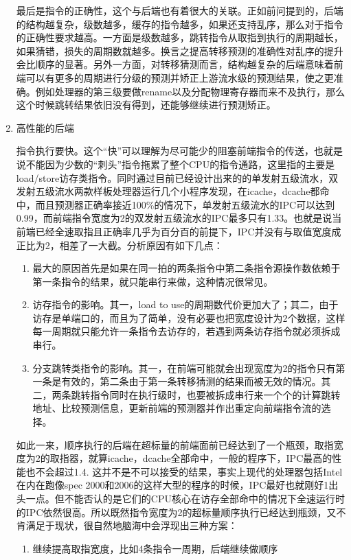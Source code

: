 \documentclass[11pt]{article}
\begin{document}
\begin{enumerate}
	最后是指令的正确性，这个与后端也有着很大的关联。正如前问提到的，后端的结构越复杂，级数越多，缓存的指令越多，如果还支持乱序，那么对于指令的正确性要求越高。一方面是级数越多，跳转指令从取指到执行的周期越长，如果猜错，损失的周期数就越多。换言之提高转移预测的准确性对乱序的提升会比顺序的显著。另外一方面，对转移猜测而言，结构越复杂的后端意味着前端可以有更多的周期进行分级的预测并矫正上游流水级的预测结果，使之更准确。例如处理器的第三级要做rename以及分配物理寄存器而来不及执行，那么这个时候跳转结果依旧没有得到，还能够继续进行预测矫正。
	\item 高性能的后端
	
	指令执行要快。这个``快''可以理解为尽可能少的阻塞前端指令的传送，也就是说不能因为少数的``刺头''指令拖累了整个CPU的指令通路，这里指的主要是load/store访存类指令。同时通过目前已经设计出来的的单发射五级流水，双发射五级流水两款样板处理器运行几个小程序发现，在icache，dcache都命中，而且预测器正确率接近100\%的情况下，单发射五级流水的IPC可以达到0.99，而前端指令宽度为2的双发射五级流水的IPC最多只有1.33。也就是说当前端已经全速取指且正确率几乎为百分百的前提下，IPC并没有与取值宽度成正比为2，相差了一大截。分析原因有如下几点：
	\begin{enumerate}
		\item 最大的原因首先是如果在同一拍的两条指令中第二条指令源操作数依赖于第一条指令的结果，就只能串行来做，这种情况很常见。
		\item 访存指令的影响。其一，load to use的周期数代价更加大了；其二，由于访存是单端口的，而且为了简单，没有必要也把宽度设计为2个数据，这样每一周期就只能允许一条指令去访存的，若遇到两条访存指令就必须拆成串行。
		\item 分支跳转类指令的影响。其一，在前端可能就会出现宽度为2的指令只有第一条是有效的，第二条由于第一条转移猜测的结果而被无效的情况。其二，两条跳转指令同时在执行级时，也要被拆成串行来一个个的计算跳转地址、比较预测信息，更新前端的预测器并作出重定向前端指令流的选择。
	\end{enumerate}
	如此一来，顺序执行的后端在超标量的前端面前已经达到了一个瓶颈，取指宽度为2的取指器，就算icache，dcache全部命中，一般的程序下，IPC最高的性能也不会超过1.4. 这并不是不可以接受的结果，事实上现代的处理器包括Intel在内在跑像spec 2000和2006的这样大型的程序的时候，IPC最好也就刚好1出头一点。但不能否认的是它们的CPU核心在访存全部命中的情况下全速运行时的IPC依然很高。所以既然指令宽度为2的超标量顺序执行已经达到瓶颈，又不肯满足于现状，很自然地脑海中会浮现出三种方案：
	\begin{enumerate}
		\item 继续提高取指宽度，比如4条指令一周期，后端继续做顺序

\end{enumerate}
\end{enumerate}
\end{document}
